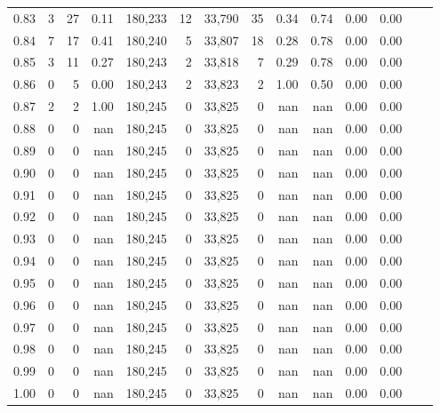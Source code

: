 \begin{tabular}{rrrrrrrrrrrrrr}
0.83 &      3 &     27 &    0.11 &  180,233 &       12 &  33,790 &      35 &  0.34 &  0.74 &  0.00 &      0.00 \\
0.84 &      7 &     17 &    0.41 &  180,240 &        5 &  33,807 &      18 &  0.28 &  0.78 &  0.00 &      0.00 \\
0.85 &      3 &     11 &    0.27 &  180,243 &        2 &  33,818 &       7 &  0.29 &  0.78 &  0.00 &      0.00 \\
0.86 &      0 &      5 &    0.00 &  180,243 &        2 &  33,823 &       2 &  1.00 &  0.50 &  0.00 &      0.00 \\
0.87 &      2 &      2 &    1.00 &  180,245 &        0 &  33,825 &       0 &   nan &   nan &  0.00 &      0.00 \\
0.88 &      0 &      0 &     nan &  180,245 &        0 &  33,825 &       0 &   nan &   nan &  0.00 &      0.00 \\
0.89 &      0 &      0 &     nan &  180,245 &        0 &  33,825 &       0 &   nan &   nan &  0.00 &      0.00 \\
0.90 &      0 &      0 &     nan &  180,245 &        0 &  33,825 &       0 &   nan &   nan &  0.00 &      0.00 \\
0.91 &      0 &      0 &     nan &  180,245 &        0 &  33,825 &       0 &   nan &   nan &  0.00 &      0.00 \\
0.92 &      0 &      0 &     nan &  180,245 &        0 &  33,825 &       0 &   nan &   nan &  0.00 &      0.00 \\
0.93 &      0 &      0 &     nan &  180,245 &        0 &  33,825 &       0 &   nan &   nan &  0.00 &      0.00 \\
0.94 &      0 &      0 &     nan &  180,245 &        0 &  33,825 &       0 &   nan &   nan &  0.00 &      0.00 \\
0.95 &      0 &      0 &     nan &  180,245 &        0 &  33,825 &       0 &   nan &   nan &  0.00 &      0.00 \\
0.96 &      0 &      0 &     nan &  180,245 &        0 &  33,825 &       0 &   nan &   nan &  0.00 &      0.00 \\
0.97 &      0 &      0 &     nan &  180,245 &        0 &  33,825 &       0 &   nan &   nan &  0.00 &      0.00 \\
0.98 &      0 &      0 &     nan &  180,245 &        0 &  33,825 &       0 &   nan &   nan &  0.00 &      0.00 \\
0.99 &      0 &      0 &     nan &  180,245 &        0 &  33,825 &       0 &   nan &   nan &  0.00 &      0.00 \\
1.00 &      0 &      0 &     nan &  180,245 &        0 &  33,825 &       0 &   nan &   nan &  0.00 &      0.00 \\
\bottomrule
\end{tabular}
